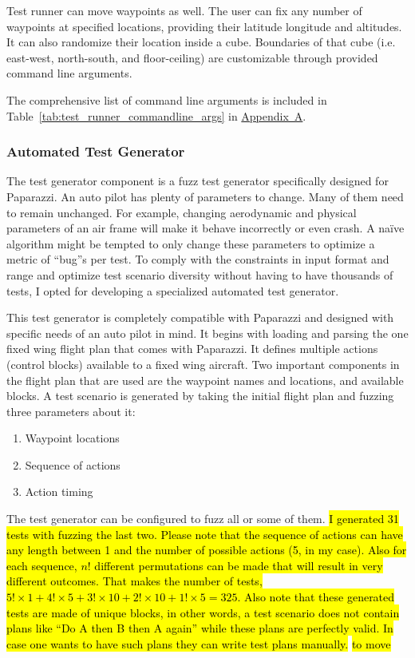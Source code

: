 Test runner can move waypoints as well. The user can fix any number of waypoints at specified locations, providing their latitude longitude and altitudes. It can also randomize their location inside a cube. Boundaries of that cube (i.e. east-west, north-south, and floor-ceiling) are customizable through provided command line arguments.

The comprehensive list of command line arguments is included in Table~\ref{tab:test_runner_commandline_args} in \hyperref[appendixa]{Appendix~A}.


\subsubsection{Automated Test Generator}
The test generator component is a fuzz test generator specifically designed for Paparazzi. An auto pilot has plenty of parameters to change. Many of them need to remain unchanged. For example, changing aerodynamic and physical parameters of an air frame will make it behave incorrectly or even crash. A naïve algorithm might be tempted to only change these parameters to optimize a metric of ``bug''s per test. To comply with the constraints in input format and range and optimize test scenario diversity without having to have thousands of tests, I opted for developing a specialized automated test generator. 

This test generator is completely compatible with Paparazzi and designed with specific needs of an auto pilot in mind. It begins with loading and parsing the one fixed wing flight plan that comes with Paparazzi. It defines multiple actions (control blocks) available to a fixed wing aircraft. Two important components in the flight plan that are used are the waypoint names and locations, and available blocks. A test scenario is generated by taking the initial flight plan and fuzzing three parameters about it:
\begin{enumerate}
    \item Waypoint locations
    \item Sequence of actions 
    \item Action timing
\end{enumerate}

The test generator can be configured to fuzz all or some of them. \hl{I generated 31 tests with fuzzing the last two. Please note that the sequence of actions can have any length between 1 and the number of possible actions (5, in my case). Also for each sequence, $n!$ different permutations can be made that will result in very different outcomes. That makes the number of tests, $5!\times1+4!\times5+3!\times10+2!\times10+1!\times5=325$. Also note that these generated tests are made of unique blocks, in other words, a test scenario does not contain plans like ``Do A then B then A again'' while these plans are perfectly valid. In case one wants to have such plans they can write test plans manually.} \hl{to move}

